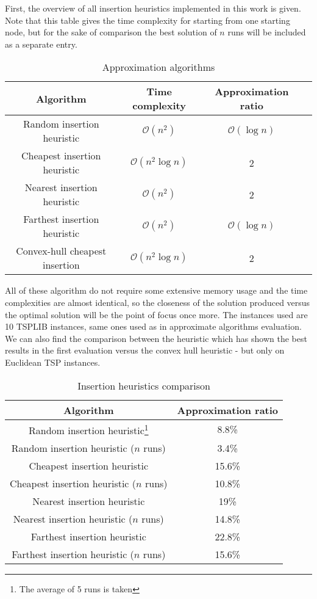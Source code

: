 \documentclass[12pt,twoside,notitlepage]{report}
\begin{document}
First, the overview of all insertion heuristics implemented in this work is given. Note that this table gives the time complexity for starting from one starting node, but for the sake of comparison the best solution of $n$ runs will be included as a separate entry.

\begin{table}[h!]
\centering
\begin{tabular}{||c | c | c | c||} 
 \hline
 Algorithm & Time complexity & Approximation ratio \\ [0.5ex] 
 \hline\hline
 Random insertion heuristic & $ \mathcal{O}(n^2) $ & $ \mathcal{O}(\log n) $ \\
 Cheapest insertion heuristic & $ \mathcal{O}(n^2\log n) $ & 2 \\
 Nearest insertion heuristic & $ \mathcal{O}(n^2) $ & 2 \\
 Farthest insertion heuristic & $ \mathcal{O}(n^2) $ & $ \mathcal{O}(\log n) $ \\
 Convex-hull cheapest insertion & $ \mathcal{O}(n^2 \log n) $ & 2 \\
 \hline
\end{tabular}
\caption{Approximation algorithms}
\label{table:4}
\end{table}

All of these algorithm do not require some extensive memory usage and the time complexities are almost identical, so the closeness of the solution produced versus the optimal solution will be the point of focus once more. The instances used are 10 TSPLIB instances, same ones used as in approximate algorithms evaluation. We can also find the comparison between the heuristic which has shown the best results in the first evaluation versus the convex hull heuristic - but only on Euclidean TSP instances.

\begin{table}[h!]
\centering
\begin{tabular}{||c || c ||} 
 \hline
 Algorithm & Approximation ratio \\ [0.5ex] 
 \hline\hline
 Random insertion heuristic\footnote{The average of 5 runs is taken} &  8.8\% \\
 Random insertion heuristic ($n$ runs) & 3.4\% \\
 Cheapest insertion heuristic &  15.6\% \\
 Cheapest insertion heuristic ($n$ runs) & 10.8\% \\
 Nearest insertion heuristic & 19\% \\
 Nearest insertion heuristic ($n$ runs) & 14.8\% \\
 Farthest insertion heuristic & 22.8\% \\
 Farthest insertion heuristic ($n$ runs) & 15.6\% \\
 \hline
\end{tabular}
\caption{Insertion heuristics comparison}
\label{comparison:5}
\end{table}
\end{document}
